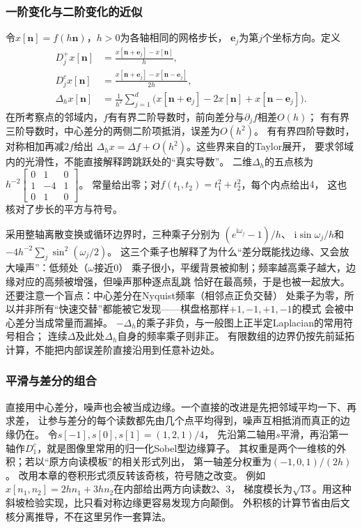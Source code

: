 \subsubsection{一阶变化与二阶变化的近似}
令$x[\bm n]=f(h\bm n)$，$h>0$为各轴相同的网格步长，
$\bm e_j$为第$j$个坐标方向。定义
\begin{equation}
 \begin{aligned}
 D_j^+x[\bm n]&=\frac{x[\bm n+\bm e_j]-x[\bm n]}h,\\
 D_j^cx[\bm n]&=\frac{x[\bm n+\bm e_j]-x[\bm n-\bm e_j]}{2h},\\
 \Delta_hx[\bm n]&=\frac1{h^2}\sum_{j=1}^d
 \bigl(x[\bm n+\bm e_j]-2x[\bm n]+x[\bm n-\bm e_j]\bigr).
 \end{aligned}
 \label{eq:signal-grid-differences}
\end{equation}
在所考察点的邻域内，$f$有有界二阶导数时，前向差分与$\partial_jf$相差$O(h)$；
有有界三阶导数时，中心差分的两侧二阶项抵消，误差为$O(h^2)$。
有有界四阶导数时，对称相加再减$2f$给出
$\Delta_hx=\Delta f+O(h^2)$。这些界来自的Taylor展开，
要求邻域内的光滑性，不能直接解释跨跳跃处的“真实导数”。
二维$\Delta_h$的五点核为
$h^{-2}\begin{bmatrix}0&1&0\\1&-4&1\\0&1&0\end{bmatrix}$。
常量给出零；对$f(t_1,t_2)=t_1^2+t_2^2$，每个内点给出$4$，
这也核对了步长的平方与符号。

采用整轴离散变换或循环边界时，三种乘子分别为
$(e^{\mathrm i\omega_j}-1)/h$、
$\mathrm i\sin\omega_j/h$和
$-4h^{-2}\sum_j\sin^2(\omega_j/2)$。
这三个乘子也解释了为什么“差分既能找边缘、又会放大噪声”：低频处（$\omega$接近$0$）
乘子很小，平缓背景被抑制；频率越高乘子越大，边缘对应的高频被增强，但噪声那种逐点乱跳
恰好在最高频，于是也被一起放大。还要注意一个盲点：中心差分在Nyquist频率（相邻点正负交替）
处乘子为零，所以并非所有“快速交替”都能被它发现——棋盘格那样$+1,-1,+1,-1$的模式
会被中心差分当成常量而漏掉。
$-\Delta_h$的乘子非负，与一般图上正半定Laplacian的常用符号相合；
连续$\Delta$及此处$\Delta_h$自身的频率乘子则非正。
有限数组的边界仍按先前延拓计算，不能把内部误差阶直接沿用到任意补边处。

\subsubsection{平滑与差分的组合}
直接用中心差分，噪声也会被当成边缘。一个直接的改进是先把邻域平均一下、再求差，
让参与差分的每个读数都先由几个点平均得到，噪声互相抵消而真正的边缘仍在。
令$s[-1],s[0],s[1]=(1,2,1)/4$，
先沿第二轴用$s$平滑，再沿第一轴作$D_1^c$，就是图像里常用的归一化Sobel型边缘算子。
其权重是两个一维核的外积；若以“原方向读模板”的相关形式列出，
第一轴差分权重为$(-1,0,1)/(2h)$。
改用本章的卷积形式须反转该奇核，符号随之改变。
例如$x[n_1,n_2]=2hn_1+3hn_2$在内部给出两方向读数$2$、$3$，
梯度模长为$\sqrt{13}$。用这种斜坡检验实现，比只看对称边缘更容易发现方向颠倒。
外积核的计算节省由后文核分离推导，不在这里另作一套算法。

